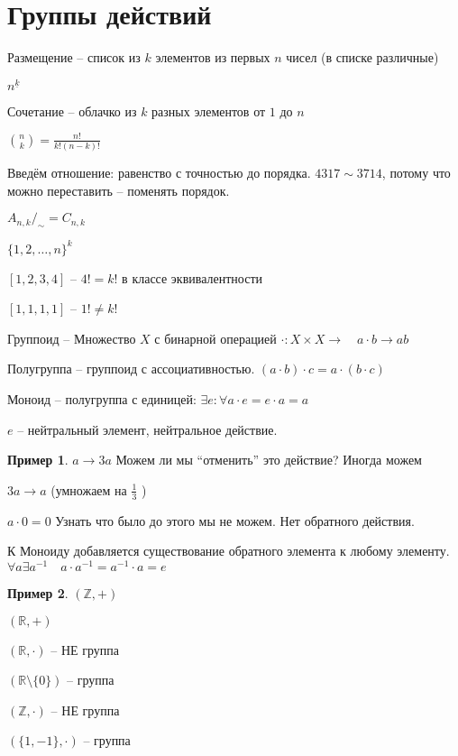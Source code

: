 \documentclass{book}
\newcommand\R{\ensuremath{\mathbb{R}}}
\newcommand\Z{\ensuremath{\mathbb{Z}}}
\theoremstyle{definition}
\newtheorem*{example}{Пример}
\begin{document}
\section{Группы действий}

Размещение -- список из $k$ элементов из первых  $n$ чисел (в списке различные)

$n^{\underline{k}}$

Сочетание -- облачко из  $k$ разных элементов от  $1$ до  $n$

${n\choose k} = \frac{n!}{k!(n-k)!}$

Введём отношение: равенство с точностью до порядка. $4317\sim 3714$, потому что можно переставить -- поменять порядок.

$A_{n,k}/_{\sim } = C_{n,k}$ 

$\{1,2,\ldots,n\}^k$

$[1,2,3,4]$ --  $4! = k!$ в классе эквивалентности

$[1,1,1,1]$ --  $1!\neq k!$

\begin{definition}
    Группоид -- Множество $X$ с бинарной операцией  $\cdot :X\times X\to \quad a\cdot b\to ab$
\end{definition}
\begin{definition}
    Полугруппа -- группоид с ассоциативностью. $(a\cdot b)\cdot c = a\cdot (b\cdot c)$
\end{definition}
\begin{definition}
    Моноид -- полугруппа с единицей: $\exists e: \forall a\cdot e=e\cdot a=a$

    $e$ -- нейтральный элемент, нейтральное действие.
\end{definition}

 \begin{example}
    $a\to 3a$ Можем ли мы ``отменить'' это действие? Иногда можем

    $3a\to a$ (умножаем на $\frac{1}{3}$ )

    $a\cdot 0=0$ Узнать что было до этого мы не можем. Нет обратного действия.
\end{example}

\begin{definition}
    К Моноиду добавляется существование обратного элемента к любому элементу.  $\forall a \exists a^{-1}\quad a\cdot a^{-1} = a^{-1}\cdot a = e$
\end{definition}

\begin{example}
    $(\Z , +)$

    $(\R, +)$

    $(\R, \cdot )$ -- НЕ группа

    $(\R\setminus \{0\})$ -- группа

    $(\Z , \cdot )$ -- НЕ группа

    $\left( \{1,-1\}, \cdot  \right) $ -- группа
\end{example}
\end{document}
